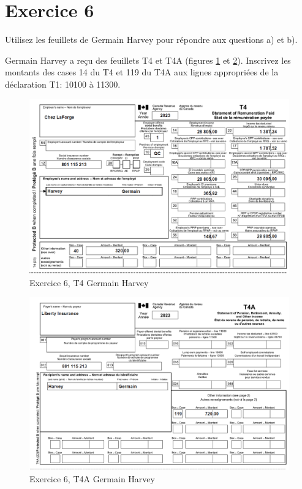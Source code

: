 \section{Exercice 6}
\setcounter{question}{0}
\begin{question}
	Utilisez les feuillets de Germain Harvey pour répondre aux questions a) et b).
\end{question}
\setcounter{sousQuestion}{0}
\begin{sousQuestion}
	Germain Harvey a reçu des feuillets T4 et T4A (figures \ref{fig:Chap2Exercice6Q1T4} et \ref{fig:Chap2Exercice6Q1T4A}). Inscrivez les montants des cases 14 du T4 et 119 du T4A aux lignes appropriées de la déclaration T1: 10100 à 11300.
	\begin{figure}
		\centering
		\includegraphics[width=.9\textwidth]{exercice/2-6/Q1/a-T4.png}
		\caption{Exercice 6, T4 Germain Harvey}
		\label{fig:Chap2Exercice6Q1T4}
	\end{figure}
	\begin{figure}
		\centering
		\includegraphics[width=.9\textwidth]{exercice/2-6/Q1/a-T4A.png}
		\caption{Exercice 6, T4A Germain Harvey}
		\label{fig:Chap2Exercice6Q1T4A}
	\end{figure}
\end{sousQuestion}
